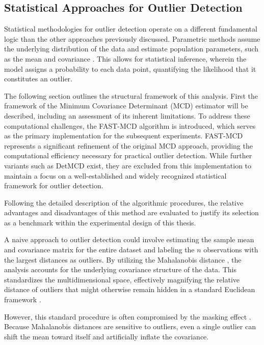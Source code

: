\subsection{Statistical Approaches for Outlier Detection}\label{sec:mcd}
Statistical methodologies for outlier detection operate on a different fundamental logic than the other approaches previously discussed. 
Parametric methods assume the underlying distribution of the data and estimate population parameters, such as the mean and covariance \cite{smiti2020critical}. 
This allows for statistical inference, wherein the model assigns a probability to each data point, quantifying the likelihood that it constitutes an outlier.


The following section outlines the structural framework of this analysis. 
First the framework of the Minimum Covariance Determinant (MCD) \cite{rousseeuw1985multivariate} estimator will be described, including an assessment of its inherent limitations. 
To address these computational challenges, the FAST-MCD algorithm is introduced, which serves as the primary implementation for the subsequent experiments. 
FAST-MCD \cite{rousseeuw1999fast} represents a significant refinement of the original MCD approach, providing the computational efficiency necessary for practical outlier detection.
While further variants such as DetMCD \citep{hubert2012deterministic} exist, they are excluded from this implementation to maintain a focus on a well-established and widely recognized statistical framework for outlier detection. 


Following the detailed description of the algorithmic procedures, the relative advantages and disadvantages of this method are evaluated to justify its selection as a benchmark within the experimental design of this thesis.

\newpage
A naive approach to outlier detection could involve estimating the sample mean and covariance matrix for the entire dataset and labeling the $n$ observations with the largest distances as outliers.
By utilizing the Mahalanobis distance \citep{mahalanobis2018generalized}, the analysis accounts for the underlying covariance structure of the data. 
This standardizes the multidimensional space, effectively magnifying the relative distance of outliers that might otherwise remain hidden in a standard Euclidean framework \citep[Chapter 2]{leys2018detecting}. 


However, this standard procedure is often compromised by the masking effect \citep[Chapter 1]{hardin2005distribution}. 
Because Mahalanobis distances are sensitive to outliers, even a single outlier can shift the mean toward itself and artificially inflate the covariance. 



